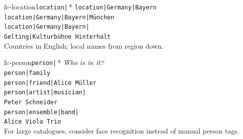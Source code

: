 \documentclass[a3paper,landscape,10pt]{article}
\newcommand{\cmd}[1]{\texttt{\small #1}}
\begin{document}
\begin{minipage}[t]{0.64\textwidth}
\begin{minipage}[t]{0.244\textwidth}
\begin{facetcard}{fc-location}{\texttt{location|}\,*}
    \cmd{location|Germany|Bayern}\\
    \cmd{location|Germany|Bayern|München}\\
    \cmd{location|Germany|Bayern|}\\
    \hspace*{1em}\cmd{Gelting|Kulturbühne Hinterhalt}\\[2pt]
    {\color{maki-stone} Countries in English; local names
    from region down.}
  \end{facetcard}\end{minipage}\hfill
  \begin{minipage}[t]{0.244\textwidth}\begin{facetcard}{fc-person}{\texttt{person|}\,*}
    \textit{\small Who is in it?}\\[3pt]
    \scriptsize
    \cmd{person|family}\\
    \cmd{person|friend|Alice Müller}\\
    \cmd{person|artist|musician|}\\
    \hspace*{1em}\cmd{Peter Schneider}\\
    \cmd{person|ensemble|band|}\\
    \hspace*{1em}\cmd{Alice Viola Trio}\\[2pt]
    {\color{maki-stone} For large catalogues, consider face
    recognition instead of manual person tags.}
  \end{facetcard}\end{minipage}

  \vspace{10pt}


\end{minipage}
\end{document}
